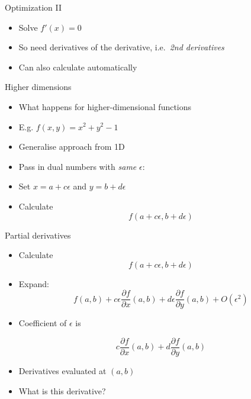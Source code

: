 \begin{frame}{Optimization II}
\protect\hypertarget{optimization-ii}{}

\begin{itemize}
\item
  Solve \(f'(x) = 0\)
\item
  So need derivatives of the derivative, i.e.~\emph{2nd derivatives}
\item
  Can also calculate automatically
\end{itemize}

\end{frame}

\begin{frame}{Higher dimensions}
\protect\hypertarget{higher-dimensions}{}

\begin{itemize}
\item
  What happens for higher-dimensional functions
\item
  E.g. \(f(x, y) = x^2 + y^2 - 1\)
\item
  Generalise approach from 1D
\item
  Pass in dual numbers with \emph{same} \(\epsilon\):
\item
  Set \(x = a + c\epsilon\) and \(y = b + d \epsilon\)
\item
  Calculate \[f(a + c\epsilon, b + d \epsilon)\]
\end{itemize}

\end{frame}

\begin{frame}{Partial derivatives}
\protect\hypertarget{partial-derivatives}{}

\begin{itemize}
\item
  Calculate \[f(a + c\epsilon, b + d \epsilon)\]
\item
  Expand: \[f(a, b) + c \epsilon \frac{\partial f}{\partial x}(a, b)
                + d \epsilon \frac{\partial f}{\partial y}(a, b)
                + O(\epsilon^2)\]
\item
  Coefficient of \(\epsilon\) is

  \[c \frac{\partial f}{\partial x}(a, b) + d  \frac{\partial f}{\partial y}(a, b)\]
\item
  Derivatives evaluated at \((a, b)\)
\item
  What is this derivative?
\end{itemize}

\end{frame}

